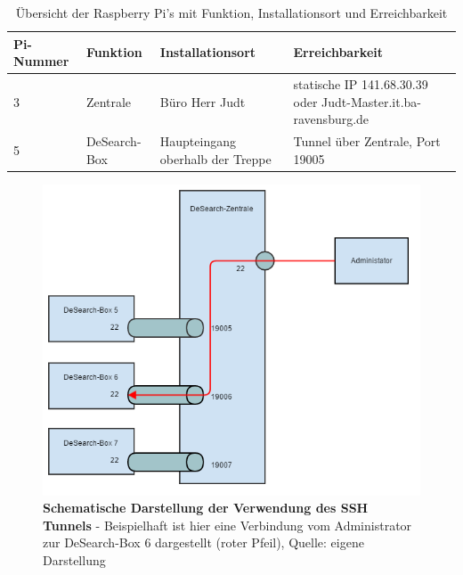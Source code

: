 \begin{table}[h]
	\begin{tabular}{ | p{} | p{} | p{4cm} | p{6cm} |}
		\hline
		\textbf{Pi-Nummer} & \textbf{Funktion} & \textbf{Installationsort} &  \textbf{Erreichbarkeit} \\ \hline
		3 & Zentrale & Büro Herr Judt & statische IP 141.68.30.39 oder \mbox{Judt-Master.it.ba-ravensburg.de} \\ \hline
		5 & DeSearch-Box & Haupteingang oberhalb der Treppe & Tunnel über Zentrale, Port 19005 \\ \hline
		
	\end{tabular}
	\caption{Übersicht der Raspberry Pi's mit Funktion, Installationsort und Erreichbarkeit}
	\label{tab:pis}
\end{table}

\begin{figure}
	\centering
	\includegraphics[width=\textwidth]{./images/tunnel.png}
	\caption[Schematische Darstellung der Verwendung des SSH Tunnels]{\textbf{Schematische Darstellung der Verwendung des SSH Tunnels} - Beispielhaft ist hier eine Verbindung vom Administrator zur DeSearch-Box 6 dargestellt (roter Pfeil), Quelle: eigene Darstellung}
	\label{fig:tunnel}
\end{figure} 

